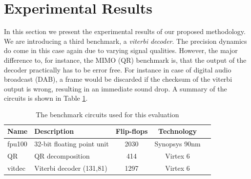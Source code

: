 \documentclass[conference]{IEEEtran}
\begin{document}
\section{Experimental Results}
\label{sec:experimental_results}
In this section we present the experimental results of our proposed methodology. We are introducing a third benchmark, a \emph{viterbi decoder}. The precision dynamics do come in this case again due to varying signal qualities. However, the major difference to, for instance, the MIMO (QR) benchmark is, that the output of the decoder practically has to be error free. For instance in case of digital audio broadcast (DAB), a frame would be discarded if the checksum of the viterbi output is wrong, resulting in an immediate sound drop. A summary of the circuits is shown in Table \ref{tab:benchmark_circuits}.
\begin{table}[htb]
\caption{The benchmark circuits used for this evaluation}
\label{tab:benchmark_circuits}
\centering
\begin{tabular} {| l | l | c | c | c |}
\hline
Name & Description  & Flip-flops & Technology\\
\hline\hline
fpu100 \cite{al2007fpu100} & 32-bit floating point unit  & 2030 & Synopsys 90nm\\
QR \cite{gimmler-dumont_asic_2013} & QR decomposition  & 414 & Virtex 6\\
vitdec \cite{fehrenz2014viterbi} & Viterbi decoder (131,81)  & 1297 & Virtex 6\\
\hline
\end{tabular}
\end{table}
\end{document}
